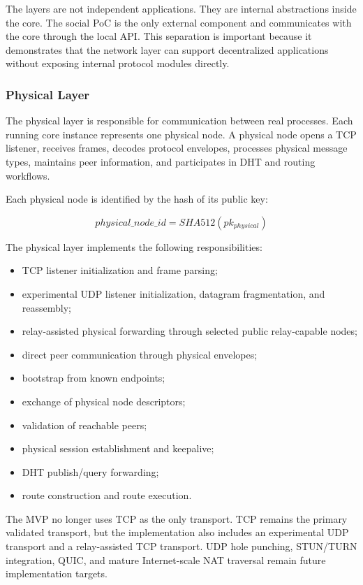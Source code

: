 \documentclass[12pt,a4paper]{article}
\begin{document}
The layers are not independent applications. They are internal abstractions inside the core. The social PoC is the only external component and communicates with the core through the local API. This separation is important because it demonstrates that the network layer can support decentralized applications without exposing internal protocol modules directly.

\subsubsection{Physical Layer}
\label{subsec:physical-layer-implementation}

The physical layer is responsible for communication between real processes. Each running core instance represents one physical node. A physical node opens a TCP listener, receives frames, decodes protocol envelopes, processes physical message types, maintains peer information, and participates in DHT and routing workflows.

Each physical node is identified by the hash of its public key:

\begin{equation}
    physical\_node\_id = SHA512(pk_{physical})
\end{equation}

The physical layer implements the following responsibilities:

\begin{itemize}
    \item TCP listener initialization and frame parsing;
    \item experimental UDP listener initialization, datagram fragmentation, and reassembly;
    \item relay-assisted physical forwarding through selected public relay-capable nodes;
    \item direct peer communication through physical envelopes;
    \item bootstrap from known endpoints;
    \item exchange of physical node descriptors;
    \item validation of reachable peers;
    \item physical session establishment and keepalive;
    \item DHT publish/query forwarding;
    \item route construction and route execution.
\end{itemize}

The MVP no longer uses TCP as the only transport. TCP remains the primary validated transport, but the implementation also includes an experimental UDP transport and a relay-assisted TCP transport. UDP hole punching, STUN/TURN integration, QUIC, and mature Internet-scale NAT traversal remain future implementation targets.
\end{document}
